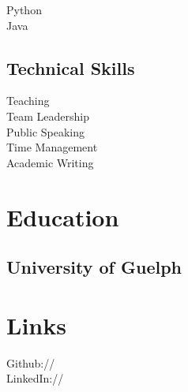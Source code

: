 \documentclass[]{deedy-resume-openfont}
\begin{document}
\begin{minipage}[t]{0.33\textwidth}
\textbullet{} Python\\
\textbullet{} Java\\
\sectionsep
\sectionsep
\sectionsep

\subsection{Technical Skills}

\textbullet{} Teaching \\
\textbullet{} Team Leadership \\
\textbullet{} Public Speaking\\
\textbullet{} Time Management\\
\textbullet{} Academic Writing\\

\sectionsep
\sectionsep



\section{Education} 

\subsection{University of Guelph}
\sectionsep


\section{Links} 
Github:// \href{https://github.com/ChrisKatsaras}{} \\
LinkedIn://  \href{https://www.linkedin.com/in/christopher-katsaras-0a326211a/}{}
\sectionsep

%
%

\end{minipage} 
\hfill
\end{document}
